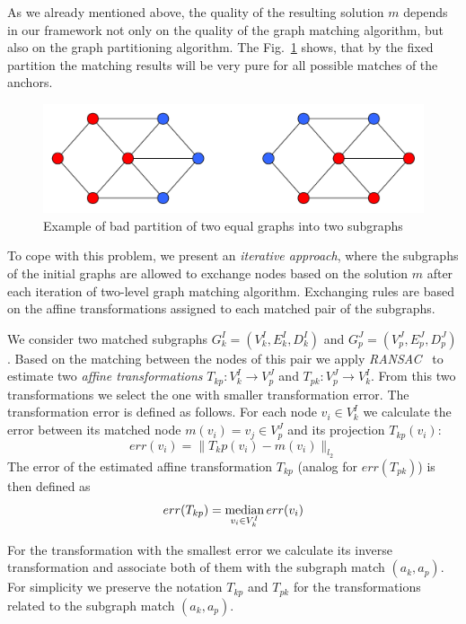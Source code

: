 As we already mentioned above, the quality of the resulting solution $m$ depends in our framework not only on the quality of the graph matching algorithm, but also on the graph partitioning algorithm. The Fig.~\ref{fig:badpartition} shows, that by the fixed partition the matching results will be very pure for all possible matches of the anchors.

\begin{figure}
	\centering
	\includegraphics[scale=0.35]{chapter2/fig/badpartition.pdf}
	\caption{Example of bad partition of two equal graphs into two subgraphs} \label{fig:badpartition}
\end{figure}


To cope with this problem, we present an \emph{iterative approach}, where the subgraphs of the initial graphs are allowed to exchange nodes based on the solution $m$ after each iteration of two-level graph matching algorithm. Exchanging rules are based on the affine transformations assigned to each matched pair of the subgraphs.

We consider two matched subgraphs $G^I_k=(V^I_k, E^I_k, D^I_k)$ and  $G^J_p=(V^J_p, E^J_p, D^J_p)$. Based on the matching between the nodes of this pair we apply \emph{RANSAC}~\cite{RANSAC} to estimate two \emph{affine transformations} $T_{kp}:V^I_k\rightarrow V^J_p$ and $T_{pk}:V^J_p\rightarrow V^I_k$. From this two transformations we select the one with smaller transformation error. The transformation error is defined as follows. For each node $v_i\in V^I_k$ we calculate the error between its matched node $m(v_i) = v_j\in V^J_p$ and its projection $T_{kp}(v_i)$: 
\begin{equation} \label{eq:err_v}
err(v_i) = \|T_kp(v_i) - m(v_i)\|_{l_2}
\end{equation}
The error of the estimated affine transformation $T_{kp}$ (analog for  $err(T_{pk})$) is then defined as
\begin{equation} \label{eq:err_T}
err(T_{kp}) = \mathop{\rm median}_{v_i\in V^I_k}err(v_i)
\end{equation}

For the transformation with the smallest error we calculate its inverse transformation and associate both of them with the subgraph match $(a_k, a_p)$. For simplicity we preserve the notation $T_{kp}$ and $T_{pk}$ for the transformations related to the subgraph match $(a_k, a_p)$.

